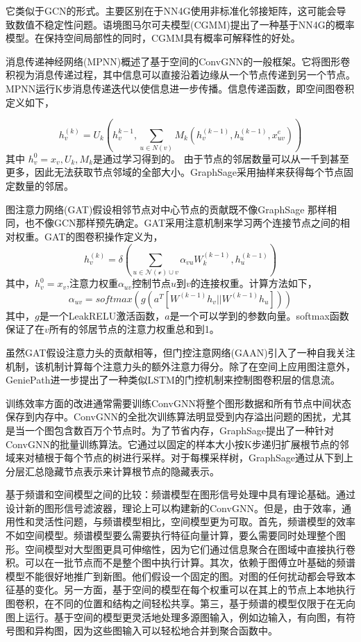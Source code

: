 它类似于GCN的形式。主要区别在于NN4G使用非标准化邻接矩阵，这可能会导致数值不稳定性问题。语境图马尔可夫模型(CGMM)提出了一种基于NN4G的概率模型。在保持空间局部性的同时，CGMM具有概率可解释性的好处。

消息传递神经网络(MPNN)概述了基于空间的ConvGNN的一般框架。它将图形卷积视为消息传递过程，其中信息可以直接沿着边缘从一个节点传递到另一个节点。MPNN运行K步消息传递迭代以使信息进一步传播。信息传递函数，即空间图卷积定义如下，

\[
h_v^{(k)}=U_k(h_v^{k-1},\sum_{u\in N(v)}M_k(h_v^{(k-1)},h_u^{(k-1)},x_{uv}^e))
\]
其中 $h_v^0=x_v,U_k,M_k$是通过学习得到的。
由于节点的邻居数量可以从一千到甚至更多，因此无法获取节点邻域的全部大小。GraphSage采用抽样来获得每个节点固定数量的邻居。

图注意力网络(GAT)假设相邻节点对中心节点的贡献既不像GraphSage 那样相同，也不像GCN那样预先确定。GAT采用注意机制来学习两个连接节点之间的相对权重。GAT的图卷积操作定义为，
\[
h_v^{(k)}=\delta(\sum_{u\in \mathcal{N(v)}\cup v}\alpha_{vu}W_k^{(k-1)},h_u^{(k-1)})
\]
其中，$h_v^0=x_v$,注意力权重$\alpha_{uv}$控制节点$u$到$v$的连接权重。计算方法如下，
\[
\alpha_{uv} = softmax(g(a^T[W^{(k-1)}h_v||W^{(k-1)}h_u]))
\]
其中，$g$是一个LeakRELU激活函数，$a$是一个可以学到的参数向量。softmax函数保证了在$v$所有的邻居节点的注意力权重总和到1。

虽然GAT假设注意力头的贡献相等，但门控注意网络(GAAN)引入了一种自我关注机制，该机制计算每个注意力头的额外注意力得分。除了在空间上应用图注意外，GeniePath进一步提出了一种类似LSTM的门控机制来控制图卷积层的信息流。

训练效率方面的改进通常需要训练ConvGNN将整个图形数据和所有节点中间状态保存到内存中。ConvGNN的全批次训练算法明显受到内存溢出问题的困扰，尤其是当一个图包含数百万个节点时。为了节省内存，GraphSage提出了一种针对ConvGNN的批量训练算法。它通过以固定的样本大小按K步递归扩展根节点的邻域来对植根于每个节点的树进行采样。对于每棵采样树，GraphSage通过从下到上分层汇总隐藏节点表示来计算根节点的隐藏表示。

基于频谱和空间模型之间的比较：频谱模型在图形信号处理中具有理论基础。通过设计新的图形信号滤波器，理论上可以构建新的ConvGNN。但是，由于效率，通用性和灵活性问题，与频谱模型相比，空间模型更为可取。首先，频谱模型的效率不如空间模型。频谱模型要么需要执行特征向量计算，要么需要同时处理整个图形。空间模型对大型图更具可伸缩性，因为它们通过信息聚合在图域中直接执行卷积。可以在一批节点而不是整个图中执行计算。其次，依赖于图傅立叶基础的频谱模型不能很好地推广到新图。他们假设一个固定的图。对图的任何扰动都会导致本征基的变化。另一方面，基于空间的模型在每个权重可以在其上的节点上本地执行图卷积，在不同的位置和结构之间轻松共享。第三，基于频谱的模型仅限于在无向图上运行。基于空间的模型更灵活地处理多源图输入，例如边输入，有向图，有符号图和异构图，因为这些图输入可以轻松地合并到聚合函数中。


